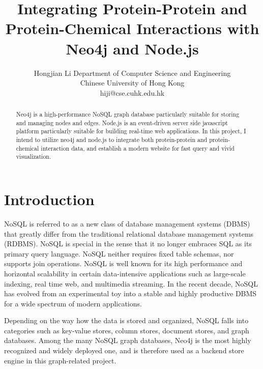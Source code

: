 \documentclass[10pt,conference,compsocconf]{../IEEEtran}
\begin{document}
\title{Integrating Protein-Protein and Protein-Chemical Interactions with Neo4j and Node.js} %
\author
{
\IEEEauthorblockN
{
Hongjian Li
\IEEEauthorblockA
{
Department of Computer Science and Engineering\\
Chinese University of Hong Kong\\
hiji@cse.cuhk.edu.hk
}
}
}
\maketitle

\begin{abstract}

Neo4j is a high-performance NoSQL graph database particularly suitable for storing and managing nodes and edges. Node.js is an event-driven server side javascript platform particularly suitable for building real-time web applications. In this project, I intend to utilize neo4j and node.js to integrate both protein-protein and protein-chemical interaction data, and establish a modern website for fast query and vivid visualization.

\end{abstract}




\section{Introduction}

NoSQL is referred to as a new class of database management systems (DBMS) that greatly differ from the traditional relational database management systems (RDBMS). NoSQL is special in the sense that it no longer embraces SQL as its primary query language. NoSQL neither requires fixed table schemas, nor supports join operations. NoSQL is well known for its high performance and horizontal scalability in certain data-intensive applications such as large-scale indexing, real time web, and multimedia streaming. In the recent decade, NoSQL has evolved from an experimental toy into a stable and highly productive DBMS for a wide spectrum of modern applications.

Depending on the way how the data is stored and organized, NoSQL falls into categories such as key-value stores, column stores, document stores, and graph databases. Among the many NoSQL graph databases, Neo4j \citep{1076} is the most highly recognized and widely deployed one, and is therefore used as a backend store engine in this graph-related project.
\end{document}
